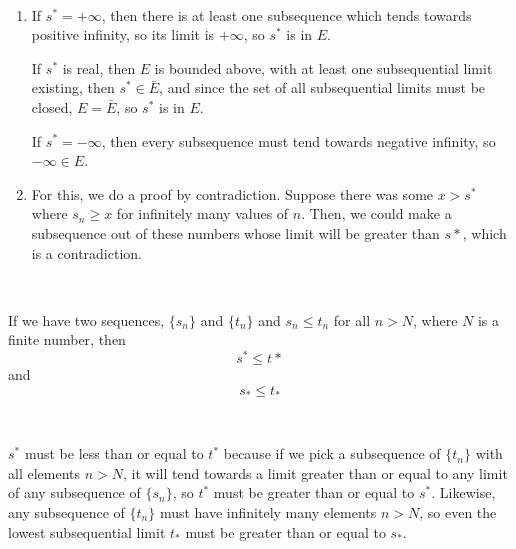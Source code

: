 \documentclass{article}
\begin{document}
\begin{customproof}
\

\begin{enumerate}
    \item If $s^* = + \infty$, then there is at least one subsequence which tends towards positive infinity, so its limit is $+ \infty$, so $s^*$ is in $E$.
    
    If $s^*$ is real, then $E$ is bounded above, with at least one subsequential limit existing, then $s^* \in \bar{E}$, and since the set of all subsequential limits must be closed, $E = \bar{E}$, so $s^*$ is in $E$.

    If $s^* = - \infty$, then every subsequence must tend towards negative infinity, so $-\infty \in E$.

    \item For this, we do a proof by contradiction. Suppose there was some $x > s^*$ where $s_n \geq x$ for infinitely many values of $n$. Then, we could make a subsequence out of these numbers whose limit will be greater than $s*$, which is a contradiction.
\end{enumerate}
\end{customproof}

\begin{theorem}
\

If we have two sequences, $\{s_n\}$ and $\{t_n\}$ and $s_n \leq t_n$ for all $n > N$, where $N$ is a finite number, then $$s^* \leq t*$$and $$s_* \leq t_*$$
\end{theorem}

\begin{customproof}
\

$s^*$ must be less than or equal to $t^*$ because if we pick a subsequence of $\{t_n\}$ with all elements $n > N$, it will tend towards a limit greater than or equal to any limit of any subsequence of $\{s_n\}$, so $t^*$ must be greater than or equal to $s^*$. Likewise, any subsequence of $\{t_n\}$ must have infinitely many elements $n > N$, so even the lowest subsequential limit $t_*$ must be greater than or equal to $s_*$.
\end{customproof}
\end{document}
